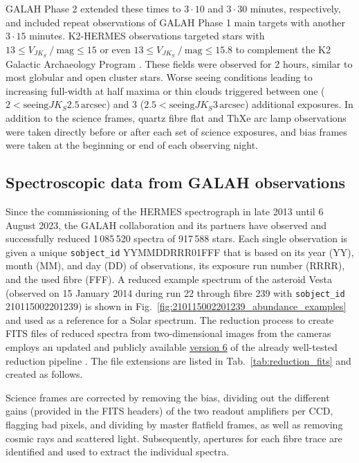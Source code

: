 \documentclass[
  journal=pasa,
  manuscript=research-paper, %
  year=2024,
  volume=37
]{cup-journal}
\newcommand{\allstarnumber}{917\,588\xspace}
\newcommand{\allspecnumber}{1\,085\,520\xspace}
\begin{document}
GALAH Phase 2 extended these times to $3 \cdot 10$ and $3 \cdot 30$ minutes, respectively, and included repeat observations of GALAH Phase 1 main targets with another $3 \cdot 15$ minutes. K2-HERMES observations targeted stars with $13 \leq V_{JK_S}~/~\mathrm{mag} \leq 15$ or even $13 \leq V_{JK_S}~/~\mathrm{mag} \leq 15.8$ to complement the K2 Galactic Archaeology Program \citep{Stello2015}. These fields were observed for 2 hours, similar to most globular and open cluster stars. Worse seeing conditions leading to increasing full-width at half maxima or thin clouds triggered between one ($2 < \mathrm{seeing}{JK_S}2.5\,\mathrm{arcsec}$) and 3 ($2.5 < \mathrm{seeing}{JK_S}3\,\mathrm{arcsec}$) additional exposures. In addition to the science frames, quartz fibre flat and ThXe arc lamp observations were taken directly before or after each set of science exposures, and bias frames were taken at the beginning or end of each observing night.

\subsection{Spectroscopic data from GALAH observations}
\label{sec:spectroscopic_data_from_galah_observations}

Since the commissioning of the HERMES spectrograph in late 2013 until 6 August 2023, the GALAH collaboration and its partners have observed and successfully reduced \allspecnumber spectra of \allstarnumber stars. Each single observation is given a unique \texttt{sobject\_id} YYMMDDRRR01FFF that is based on its year (YY), month (MM), and day (DD) of observations, its exposure run number (RRRR), and the used fibre (FFF). A reduced example spectrum of the asteroid Vesta (observed on 15 January 2014 during run 22 through fibre 239 with \texttt{sobject\_id} 210115002201239) is shown in Fig.~\ref{fig:210115002201239_abundance_examples} and used as a reference for a Solar spectrum. The reduction process to create FITS files of reduced spectra from two-dimensional images from the cameras employs an updated and publicly available \href{https://github.com/sheliak/galah_reduction/blob/master/extract6.0.py}{version 6} of the already well-tested reduction pipeline \citep{Kos2017}. The file extensions are listed in Tab.~\ref{tab:reduction_fits} and created as follows.

Science frames are corrected by removing the bias, dividing out the different gains (provided in the FITS headers) of the two readout amplifiers per CCD, flagging bad pixels, and dividing by master flatfield frames, as well as removing cosmic rays and scattered light. Subsequently, apertures for each fibre trace are identified and used to extract the individual spectra. 
\end{document}

